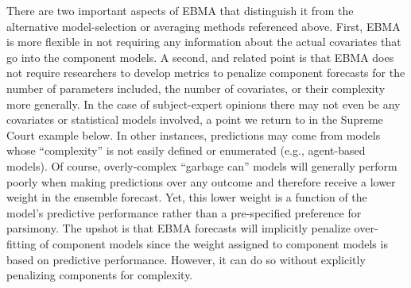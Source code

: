 There are two important aspects of EBMA that distinguish it from the
alternative model-selection or averaging methods referenced above.
First, EBMA is more flexible in not requiring any information about
the actual covariates that go into the component models. A second, and
related point is that EBMA does not require researchers to develop
metrics to penalize component forecasts for the number of parameters
included, the number of covariates, or their complexity more
generally.  In the case of subject-expert opinions there may not even
be any covariates or statistical models involved, a point we return to
in the Supreme Court example below. In other instances, predictions
may come from models whose ``complexity'' is not easily defined or
enumerated (e.g., agent-based models).  Of course, overly-complex
``garbage can'' models will generally perform poorly when making
predictions over any outcome and therefore receive a lower weight in
the ensemble forecast.  Yet, this lower weight is a function of the
model's predictive performance rather than a pre-specified preference
for parsimony.  The upshot is that EBMA forecasts will implicitly
penalize over-fitting of component models since the weight assigned to
component models is based on predictive performance.  However, it can
do so without explicitly penalizing components for complexity.



